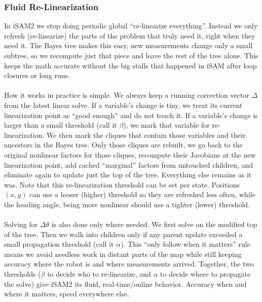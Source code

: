 \subsubsection{Fluid Re-Linearization}
In \gls{iSAM}2 we stop doing periodic global ``re-linearize everything''. Instead we only refresh (re-linearize) the parts of the problem that truly need it, right when they need it. The Bayes tree makes this easy, new measurements change only a small subtree, so we recompute just that piece and leave the rest of the tree alone. This keeps the math accurate without the big stalls that happened in \gls{iSAM} after loop closures or long runs. \cite{iSAM2_paper,Bayes_tree_for_SLAM_paper}
\\ \\ 
How it works in practice is simple. We always keep a running correction vector $\Delta$ from the latest linear solve. If a variable's change is tiny, we treat its current linearization point as ``good enough'' and do not touch it. If a variable's change is larger than a small threshold (call it $\beta$), we mark that variable for re-linearization. We then mark the cliques that contain those variables and their ancestors in the Bayes tree. Only those cliques are rebuilt, we go back to the original nonlinear factors for those cliques, recompute their Jacobians at the new linearization point, add cached ``marginal'' factors from untouched children, and eliminate again to update just the top of the tree. Everything else remains as it was. Note that this re-linearization threshold can be set per state. Positions $(x,y)$ can use a looser (higher) threshold so they are refreshed less often, while the heading angle, being more nonlinear should use a tighter (lower) threshold. \cite{Bayes_tree_for_SLAM_paper}
\\ \\
Solving for $\Delta\theta$ is also done only where needed. We first solve on the modified top of the tree. Then we walk into children only if any parent update exceeded a small propagation threshold (call it $\alpha$). This ``only follow when it matters'' rule means we avoid needless work in distant parts of the map while still keeping accuracy where the robot is and where measurements arrived. Together, the two thresholds ($\beta$ to decide who to re-linearize, and $\alpha$ to decide where to propagate the solve) give \gls{iSAM}2 its fluid, real-time/online behavior. Accuracy when and where it matters, speed everywhere else.
\\ \\
